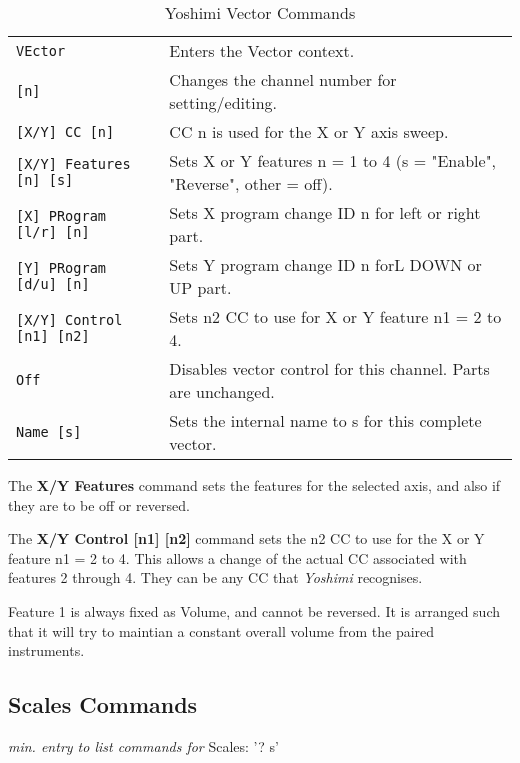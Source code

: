    \begin{table}[H]
      \centering
      \caption{Yoshimi Vector Commands}
      \label{table:yoshimi_text_vector_commands}
      \begin{tabular}{l l}

\texttt{VEctor} &
   Enters the Vector context. \\
   \texttt{[n]} &
   Changes the channel number for setting/editing.\\
\texttt{[X/Y] CC [n]} &
   CC n is used for the X or Y axis sweep. \\
\texttt{[X/Y] Features [n] [s]} &
   Sets X or Y features n = 1 to 4 (s = "Enable", "Reverse", other = off).
   \\
\texttt{[X] PRogram [l/r] [n]} &
   Sets X program change ID n for left or right part. \\
\texttt{[Y] PRogram [d/u] [n]} &
   Sets Y program change ID n forL DOWN or UP part. \\
\texttt{[X/Y] Control [n1] [n2]} &
   Sets n2 CC to use for X or Y feature n1 = 2 to 4. \\
\texttt{Off} &
   Disables vector control for this channel.  Parts are unchanged. \\
\texttt{Name [s]} &
   Sets the internal name to s for this complete vector.  \\

      \end{tabular}
   \end{table}

   The \textbf{X/Y Features} command sets the features for the
   selected axis, and also if they are to be off or reversed.

   The \textbf{X/Y Control [n1] [n2]} command
   sets the n2 CC to use for the X or Y feature n1 = 2 to 4.
   This allows a change of the actual CC associated with features 2 through
   4. They can be any CC that \textsl{Yoshimi} recognises.

   Feature 1 is always fixed as Volume, and cannot be reversed. It is
   arranged such that it will try to maintian a constant overall volume from
   the paired instruments.

\subsection{Scales Commands}
\label{subsec:command_line_scales_command_list}

\textsl{min. entry to list commands for} Scales:  '? s'

